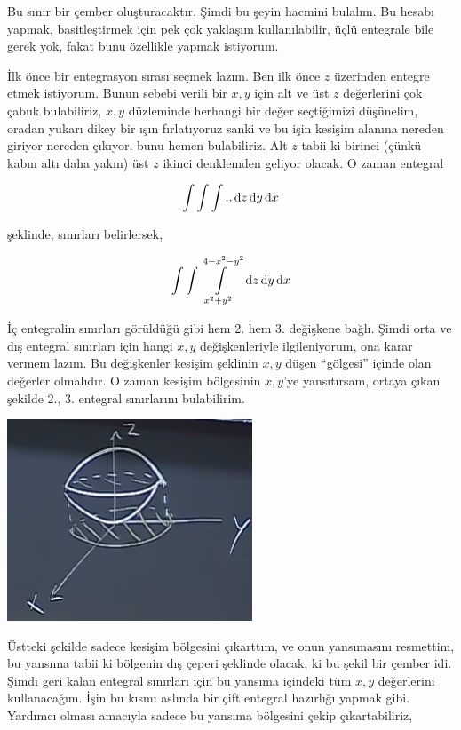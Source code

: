 \documentclass[12pt,fleqn]{article}\usepackage{../../common}
\begin{document}
Bu sınır bir çember oluşturacaktır. Şimdi bu şeyin hacmini bulalım. Bu
hesabı yapmak, basitleştirmek için pek çok yaklaşım kullanılabilir, üçlü
entegrale bile gerek yok, fakat bunu özellikle yapmak istiyorum. 

İlk önce bir entegrasyon sırası seçmek lazım. Ben ilk önce $z$ üzerinden
entegre etmek istiyorum. Bunun sebebi verili bir $x,y$ için alt ve üst $z$
değerlerini çok çabuk bulabiliriz, $x,y$ düzleminde herhangi bir değer
seçtiğimizi düşünelim, oradan yukarı dikey bir ışın fırlatıyoruz sanki ve
bu işin kesişim alanına nereden giriyor nereden çıkıyor, bunu hemen
bulabiliriz. Alt $z$ tabii ki birinci (çünkü kabın altı daha yakın) üst $z$
ikinci denklemden geliyor olacak. O zaman entegral

$$ 
\int \int \int .. \,\mathrm{d} z \,\mathrm{d} y \,\mathrm{d} x
$$

şeklinde, sınırları belirlersek,

$$ 
\int \int \int\limits_{x^2+y^2}^{4-x^2-y^2}  \,\mathrm{d} z \,\mathrm{d} y \,\mathrm{d} x
$$

İç entegralin sınırları görüldüğü gibi hem 2. hem 3. değişkene bağlı. Şimdi
orta ve dış entegral sınırları için hangi $x,y$ değişkenleriyle
ilgileniyorum, ona karar vermem lazım. Bu değişkenler kesişim şeklinin
$x,y$ düşen ``gölgesi'' içinde olan değerler olmalıdır. O zaman kesişim
bölgesinin $x,y$'ye yansıtırsam, ortaya çıkan şekilde 2., 3. entegral
sınırlarını bulabilirim. 

\begin{center}
\includegraphics[height=6cm]{25_5.png}
\end{center}

Üstteki şekilde sadece kesişim bölgesini çıkarttım, ve onun yansımasını
resmettim, bu yansıma tabii ki bölgenin dış çeperi şeklinde olacak, ki bu
şekil bir çember idi. Şimdi geri kalan entegral sınırları için bu yansıma
içindeki tüm $x,y$ değerlerini kullanacağım. İşin bu kısmı aslında bir çift
entegral hazırlığı yapmak gibi. Yardımcı olması amacıyla sadece bu yansıma
bölgesini çekip çıkartabiliriz,
\end{document}

